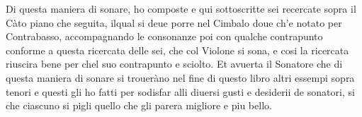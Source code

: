 Di questa maniera di sonare, ho composte e qui sottoscritte sei recercate sopra il Càto piano che seguita, ilqual si deue porre nel Cimbalo doue ch'e notato per Contrabasso, accompagnando le consonanze poi con qualche contrapunto conforme a questa ricercata delle sei, che col Violone si sona, e cosi la ricercata riuscira bene per chel suo contrapunto e sciolto. Et avuerta il Sonatore che di questa maniera di sonare si troueràno nel fine di questo libro altri essempi sopra tenori e questi gli ho fatti per sodisfar alli diuersi gusti e desiderii de sonatori, si che ciascuno si pigli quello che gli parera migliore e piu bello.
